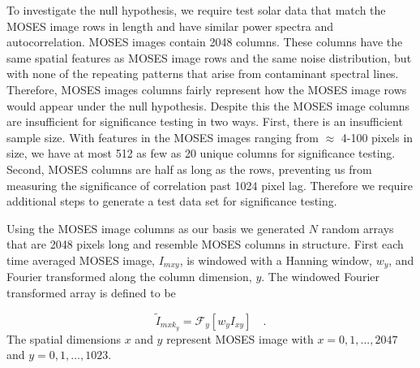 		
		To investigate the null hypothesis, we require test solar data that match the MOSES image rows in length and have similar power spectra and  autocorrelation.  
		MOSES images contain 2048 columns.  
		These columns have the same spatial features as MOSES image rows and the same noise distribution, but with none of the repeating patterns that arise from contaminant spectral lines.
		Therefore, MOSES images columns fairly represent how the MOSES image rows would appear under the null hypothesis.
		Despite this the MOSES image columns are insufficient for significance testing in two ways.  
		First, there is an insufficient sample size.
		With features in the MOSES images ranging from $\approx$ 4-100 pixels in size, we have at most 512 as few as 20 unique columns for significance testing.  
		Second, MOSES columns are half as long as the rows, preventing us from measuring the significance of correlation past 1024 pixel lag.  
		Therefore we require additional steps to generate a test data set for significance testing.
	
		Using the MOSES image columns as our basis we generated $N$ random arrays that are 2048 pixels long and resemble MOSES columns in structure.  
		First each time averaged MOSES image, $I_{mxy}$, is windowed with a Hanning window, $w_y$, and Fourier transformed along the column dimension, $y$.  
		The windowed Fourier transformed array is defined to be
	
		\begin{equation}
			\widetilde{I}_{mxk_y} = \mathcal{F}_y\left[ w_yI_{xy}\right]\quad.
			\label{eqn:ztwiddle}
		\end{equation}
   		The spatial dimensions $x$ and $y$ represent MOSES image with $ x = 0,1,...,2047$ and $y = 0,1,...,1023$.
	
